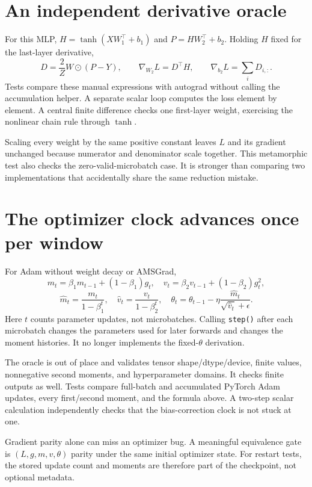 \section{An independent derivative oracle}
For this MLP, $H=\tanh(XW_1^\top+b_1)$ and $P=HW_2^\top+b_2$. Holding $H$ fixed
for the last-layer derivative,
\[
D=\frac{2}{Z}W\odot(P-Y),\qquad
\nabla_{W_2}L=D^\top H,\qquad
\nabla_{b_2}L=\sum_iD_{i,:}.
\]
Tests compare these manual expressions with autograd without calling the
accumulation helper. A separate scalar loop computes the loss element by element.
A central finite difference checks one first-layer weight, exercising the nonlinear
chain rule through $\tanh$.

Scaling every weight by the same positive constant leaves $L$ and its gradient
unchanged because numerator and denominator scale together. This metamorphic test
also checks the zero-valid-microbatch case. It is stronger than comparing two
implementations that accidentally share the same reduction mistake.

\section{The optimizer clock advances once per window}
For Adam without weight decay or AMSGrad,
\[
m_t=\beta_1m_{t-1}+(1-\beta_1)g_t,\quad
v_t=\beta_2v_{t-1}+(1-\beta_2)g_t^2,
\]
\[
\widehat m_t=\frac{m_t}{1-\beta_1^t},\quad
\widehat v_t=\frac{v_t}{1-\beta_2^t},\quad
\theta_t=\theta_{t-1}
-\eta\frac{\widehat m_t}{\sqrt{\widehat v_t}+\epsilon}.
\]
Here $t$ counts parameter updates, not microbatches. Calling \texttt{step()} after
each microbatch changes the parameters used for later forwards and changes the
moment histories. It no longer implements the fixed-$\theta$ derivation.

The oracle is out of place and validates tensor shape/dtype/device, finite values,
nonnegative second moments, and hyperparameter domains. It checks finite outputs
as well. Tests compare full-batch and accumulated PyTorch Adam updates,
every first/second moment, and the formula above. A two-step scalar calculation
independently checks that the bias-correction clock is not stuck at one.

Gradient parity alone can miss an optimizer bug. A meaningful equivalence gate is
$(L,g,m,v,\theta)$ parity under the same initial optimizer state. For restart tests,
the stored update count and moments are therefore part of the checkpoint, not
optional metadata.

